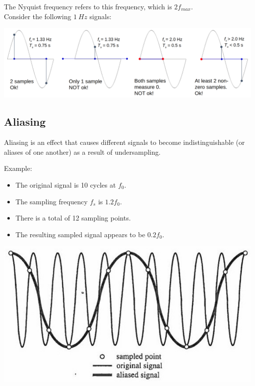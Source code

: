 \documentclass[11pt]{article}
\begin{document}
The Nyquist frequency refers to this frequency, which is \(2f_{max}\).
\\[0pt]

Consider the following \(\qty{1}{Hz}\) signals:
\begin{center}
\includegraphics[width=.9\linewidth]{./images/shannon-sampling-theorem.png}
\end{center}

 \newpage

\subsection{Aliasing}
\label{sec:org394ea65}
Aliasing is an effect that causes different signals to become indistinguishable (or aliases of one another) as a result of undersampling.

Example:
\begin{itemize}
\item The original signal is 10 cycles at \(f_0\).
\item The sampling frequency \(f_s\) is \(1.2 f_0\).
\item There is a total of 12 sampling points.
\item The resulting sampled signal appears to be \(0.2 f_0\).
\end{itemize}

\begin{center}
\includegraphics[width=.9\linewidth]{./images/aliasing-example.png}
\end{center}
\end{document}
